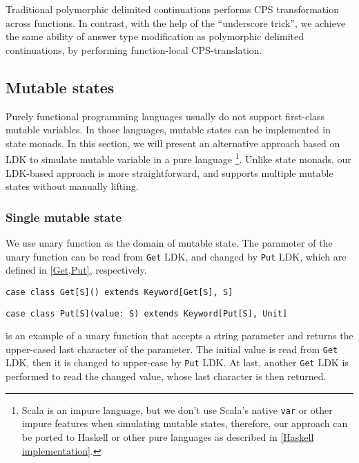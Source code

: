 Traditional polymorphic delimited continuations performs CPS transformation across functions. In contrast, with the help of the ``underscore trick'', we achieve the same ability of answer type modification as polymorphic delimited continuations, by performing function-local CPS-translation.

\subsection{Mutable states}

Purely functional programming languages usually do not support first-class mutable variables. In those languages, mutable states can be implemented in state monads. In this section, we will present an alternative approach based on LDK to simulate mutable variable in a pure language \footnote{Scala is an impure language, but we don't use Scala's native \lstinline{var} or other impure features when simulating mutable states, therefore, our approach can be ported to Haskell or other pure languages as described in \cref{Haskell implementation}.}. Unlike state monads, our LDK-based approach is more straightforward, and supports multiple mutable states without manually lifting.

\subsubsection{Single mutable state}\label{Single mutable state}

We use unary function as the domain of mutable state. The parameter of the unary function can be read from \lstinline{Get} LDK, and changed by \lstinline{Put} LDK, which are defined in \cref{Get,Put}, respectively.

\begin{lstlisting}[caption={The definition of \lstinline{Get} LDK},label={Get}]
case class Get[S]() extends Keyword[Get[S], S]
\end{lstlisting}

\begin{lstlisting}[caption={The definition of \lstinline{Put} LDK},label={Put}]
case class Put[S](value: S) extends Keyword[Put[S], Unit]
\end{lstlisting}

 is an example of a unary function that accepts a string parameter and returns the upper-cased last character of the parameter. The initial value is read from \lstinline{Get} LDK, then it is changed to upper-case by \lstinline{Put} LDK. At last, another \lstinline{Get} LDK is performed to read the changed value, whose last character is then returned.

